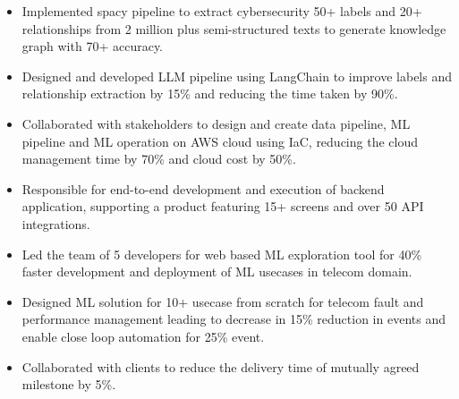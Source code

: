 \documentclass[10pt,a4paper,ragged2e,withhyper]{altacv}
\author{Madhusudan Kumar}
\date{\today}
\title{}
\begin{document}

\makecvheader

\label{sec:org10fe7df}

\label{sec:org81ae024}

\begin{itemize}
\item Implemented spacy pipeline to extract cybersecurity 50+ labels and 20+ relationships from 2 million plus semi-structured texts to generate knowledge graph with 70+ accuracy.
\item Designed and developed LLM pipeline using LangChain to improve labels and relationship extraction by 15\% and reducing the time taken by 90\%.
\item Collaborated with stakeholders to design and create data pipeline, ML pipeline and ML operation on AWS cloud using IaC, reducing the cloud management time by 70\% and cloud cost by 50\%.
\item Responsible for end-to-end development and execution of backend application, supporting a product featuring 15+ screens and over 50 API integrations.
\end{itemize}

\begin{itemize}
\item Led the team of 5 developers for web based ML exploration tool for 40\% faster development and deployment of ML usecases in telecom domain.
\item Designed ML solution for 10+ usecase from scratch for telecom fault and performance management leading to decrease in 15\% reduction in events and enable close loop automation for 25\% event.
\item Collaborated with clients to reduce the delivery time of mutually agreed milestone by 5\%.
\end{itemize}
\end{document}
